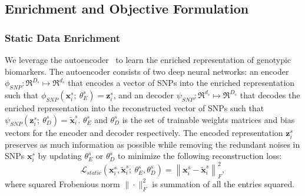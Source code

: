 \subsection{Enrichment and Objective Formulation}
\subsubsection{Static Data Enrichment}
We leverage the autoencoder~\cite{kramer1991nonlinear} to learn the enriched representation of genotypic biomarkers. The autoencoder consists of two deep neural networks: an encoder $\phi_{SNP}: \Re^{D_s} \mapsto \Re^{d_s}$ that encodes a vector of SNPs into the enriched representation such that $\phi_{SNP}(\mathbf{x}_i^s;\ \theta^s_{E}) = \mathbf{z}_i^s$, and an decoder $\psi_{SNP}: \Re^{d_s} \mapsto \Re^{D_s}$ that decodes the enriched representation into the reconstructed vector of SNPs such that $\psi_{SNP}(\mathbf{z}_i^s;\ \theta^s_{D}) = \tilde{\mathbf{x}}_i^s$. $\theta_{E}^s$ and $\theta_{D}^s$ is the set of trainable weights matrices and bias vectors for the encoder and decoder respectively. 
The encoded representation $\mathbf{z}_i^s$ preserves as much information as possible while removing the redundant noises in SNPs $\mathbf{x}_i^s$ by updating $\theta_{E}^s$ or $\theta_{D}^s$ to minimize the following reconstruction loss:
\begin{equation}
    \mathcal{L}_{static}(\mathbf{x}_i^s, \tilde{\mathbf{x}}_i^s;\ \theta_{E}^s, \theta_{D}^s) = \left\|\mathbf{x}_i^s - \tilde{\mathbf{x}}_i^s\right\|_F^2,
\end{equation}
where squared Frobenious norm $\| \cdot \|_F^2$ is summation of all the entries squared.


